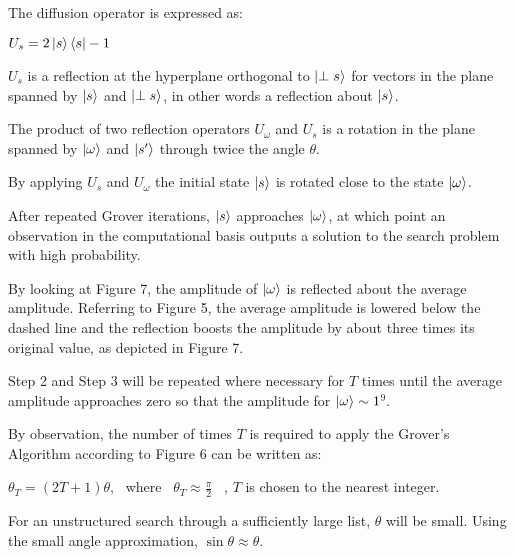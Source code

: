 \documentclass{article}
\begin{document}
\noindent
The diffusion operator is expressed as:
\vspace{5mm}

\qquad $U_s  = 2 \ket{s}\bra{s} - 1$
\vspace{5mm}

\noindent
$U_s$ is a reflection at the hyperplane orthogonal to $\ket{\perp s}$  for vectors in the plane spanned by $\ket{s}$  and $\ket{\perp s}$, in other words a reflection about $\ket{s}$. 
\vspace{5mm}

\noindent
The product of two reflection operators $U_\omega$ and $U_s$ is a rotation in the plane spanned by $\ket{\omega}$ and $\ket{s'}$ through twice the angle $\theta$.
\vspace{5mm}

\noindent
By applying $U_s$ and $U_\omega$ the initial state $\ket{s}$ is rotated close to the state $\ket{\omega}$.
\vspace{5mm}

\noindent
After repeated Grover iterations, $\ket{s}$ approaches $\ket{\omega}$, at which point an observation in the computational basis
outputs a solution to the search problem with high probability.
\vspace{5mm}

\noindent
By looking at Figure 7, the amplitude of $\ket{\omega}$ is reflected about the average amplitude. Referring to Figure 5, the average amplitude is lowered below the dashed line and the reflection boosts the amplitude by about three times its original value, as depicted in Figure 7.
\vspace{5mm}

\noindent
Step 2 and Step 3 will be repeated where necessary for $T$ times until the average amplitude approaches zero so that the amplitude for $\ket{\omega} \sim 1$\hyperlink{9}{$^9$}.
\vspace{5mm}

\noindent
By observation, the number of times $T$ is required to apply the Grover's Algorithm according to Figure 6 can be written as:
\vspace{5mm}

\noindent
\qquad $\theta_T = (2T + 1)\theta$, \ where \ $\theta_T \approx \frac{\pi}{2}$ \ , $T$ is chosen to the nearest integer. 
\vspace{5mm}

\noindent
For an unstructured search through a sufficiently large list, $\theta$ will be small. Using the small angle approximation, $\sin\theta \approx \theta$. 
\vspace{5mm}
\end{document}
